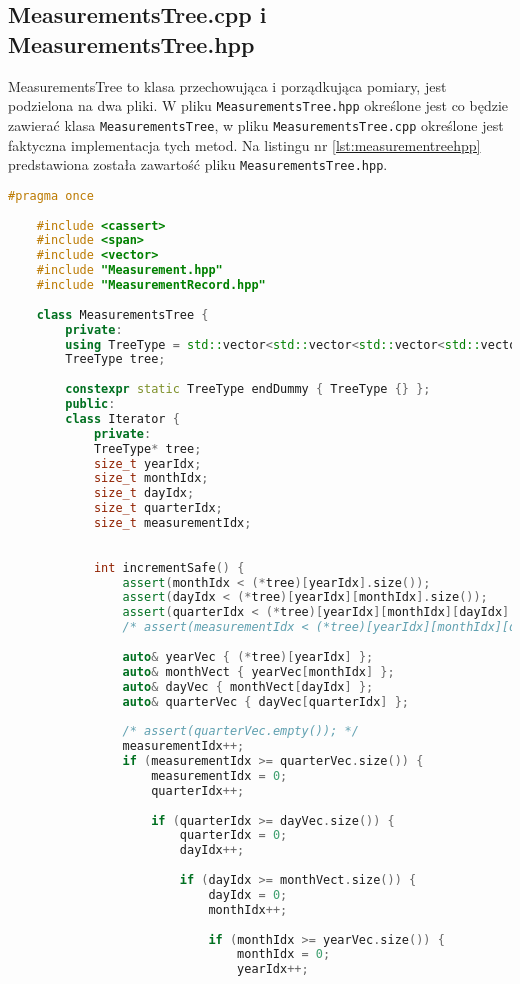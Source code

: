 \subsection{MeasurementsTree.cpp i MeasurementsTree.hpp}

MeasurementsTree to klasa przechowująca i porządkująca pomiary, jest podzielona na dwa pliki. W pliku \texttt{MeasurementsTree.hpp} określone jest co będzie zawierać klasa \texttt{MeasurementsTree}, w pliku \texttt{MeasurementsTree.cpp} określone jest faktyczna implementacja tych metod.
Na listingu nr \ref{lst:measurementreehpp} predstawiona została zawartość pliku \texttt{MeasurementsTree.hpp}.

\begin{lstlisting}[caption=Zawartość pliku \texttt{MeasurementsTree.hpp}, label={lst:measurementreehpp}, language=C++]
	#pragma once
	
	#include <cassert>
	#include <span>
	#include <vector>
	#include "Measurement.hpp"
	#include "MeasurementRecord.hpp"
	
	class MeasurementsTree {
		private:
		using TreeType = std::vector<std::vector<std::vector<std::vector<std::vector<Measurement>>>>>;
		TreeType tree;
		
		constexpr static TreeType endDummy { TreeType {} };
		public:
		class Iterator {
			private:
			TreeType* tree;
			size_t yearIdx;
			size_t monthIdx;
			size_t dayIdx;
			size_t quarterIdx;
			size_t measurementIdx;
			
			
			int incrementSafe() {
				assert(monthIdx < (*tree)[yearIdx].size());
				assert(dayIdx < (*tree)[yearIdx][monthIdx].size());
				assert(quarterIdx < (*tree)[yearIdx][monthIdx][dayIdx].size());
				/* assert(measurementIdx < (*tree)[yearIdx][monthIdx][dayIdx][quarterIdx].size()); */
				
				auto& yearVec { (*tree)[yearIdx] };
				auto& monthVect { yearVec[monthIdx] };
				auto& dayVec { monthVect[dayIdx] };
				auto& quarterVec { dayVec[quarterIdx] };
				
				/* assert(quarterVec.empty()); */
				measurementIdx++;
				if (measurementIdx >= quarterVec.size()) {
					measurementIdx = 0;
					quarterIdx++;
					
					if (quarterIdx >= dayVec.size()) {
						quarterIdx = 0;
						dayIdx++;
						
						if (dayIdx >= monthVect.size()) {
							dayIdx = 0;
							monthIdx++;
							
							if (monthIdx >= yearVec.size()) {
								monthIdx = 0;
								yearIdx++;
								

\end{lstlisting}
